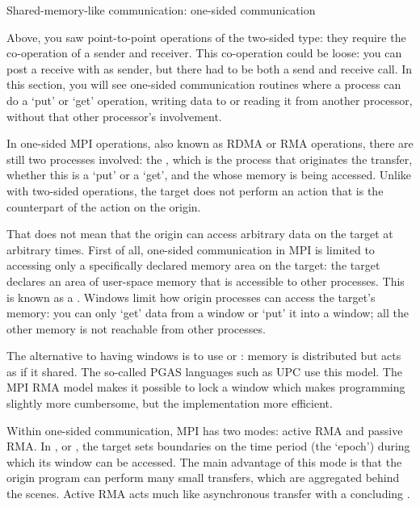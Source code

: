 

 {Shared-memory-like communication: one-sided communication}

Above, you saw  point-to-point operations of the two-sided type:
they require the co-operation of a sender and
receiver. This co-operation could be loose: you can post a receive
with  as sender, but there had to be both a send and
receive call. In this section, you will see one-sided communication 
routines where a process
can do a `put' or `get' operation, writing data to or reading it from
another processor, without that other processor's involvement.

In one-sided MPI operations, also known as \acf{RDMA} or 
\acf{RMA} operations, there
are still two processes involved: the , which is the
process that originates the transfer, whether this is a `put' or a `get',
and the  whose
memory is being accessed. Unlike with two-sided operations, the target
does not perform an action that is the counterpart of the action on the origin.

That does not mean that the origin can access arbitrary data on the target
at arbitrary times. First of all, one-sided communication in MPI
is limited to accessing only a specifically declared memory area on the target:
the target declares an area of
user-space memory that is accessible to other processes. This is known
as a . Windows limit how origin processes can access
the target's memory: you can only `get' data from a window or `put' it
into a window; all the other memory is not reachable from other processes.

The alternative to having windows is to use 
or : memory is distributed but acts as if
it shared. The so-called \acf{PGAS} languages such as \ac{UPC} use this model.
The MPI \ac{RMA} model makes it possible to 
lock a window which makes programming slightly more cumbersome, but the
implementation more efficient.

Within one-sided communication, MPI has two modes: active RMA and
passive RMA. In , or ,
the target sets boundaries on the time period (the `epoch')
during which its window can be accessed.
The main advantage
of this mode is that the origin program can perform many small transfers, which are
aggregated behind the scenes. Active RMA acts much like asynchronous transfer with a
concluding .

